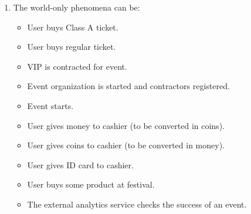 \documentclass[12pt, a4paper]{report}
\newtheorem[style=M,bodystyle=\normalfont]{theorem}{Theorem}
\newtheorem[style=M,bodystyle=\normalfont]{corollary}{Corollary}
\newtheorem[style=M,bodystyle=\normalfont]{lemma}{Lemma}
\newtheorem[style=M,bodystyle=\normalfont]{definition}{Definition}
\begin{document}
    \begin{Answer}[ref=2]
        \begin{enumerate}
            \item The world-only phenomena can be: 
                \begin{itemize}
                    \item User buys Class A ticket.
                    \item User buys regular ticket.
                    \item VIP is contracted for event.
                    \item Event organization is started and contractors registered.
                    \item Event starts.
                    \item User gives money to cashier (to be converted in coins).
                    \item User gives coins to cashier (to be converted in money).
                    \item User gives ID card to cashier.
                    \item User buys some product at festival.
                    \item The external analytics service checks the success of an event.
                \end{itemize}


\end{enumerate}
\end{Answer}
\end{document}
